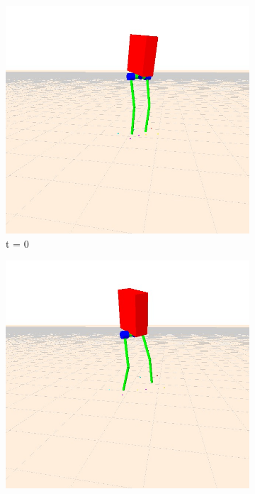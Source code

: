 \documentclass[letterpaper, 10 pt, conference]{ieeeconf}  %
\begin{document}
\begin{figure}[tbp]
  \centering
  \begin{subfigure}[b]{0.3\textwidth}
    \centering
        \includegraphics[width=\textwidth] {figures/balanceYaw1.jpg}
        \caption{t = 0}
    \label{fig:balanceYaw1}
    \end{subfigure}\hfill
    \begin{subfigure}[b]{0.3\textwidth}
    \centering
        \includegraphics[width=\textwidth] {figures/balanceYaw2.jpg}

\end{subfigure}
\end{figure}
\end{document}
